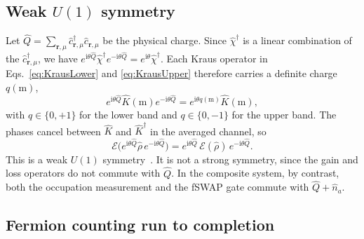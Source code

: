 \documentclass[aps,prb,10pt,twocolumn,superscriptaddress,longbibliography,floatfix]{revtex4-2}
\newcommand{\ii}{\mathrm{i}}
\newcommand{\mc}[1]{\mathcal{#1}}
\newcommand{\bfr}{\boldsymbol r}
\begin{document}
\subsection{Weak \texorpdfstring{$U(1)$}{U(1)} symmetry}

Let $\hat Q=\sum_{\bfr,\mu}\hat c^\dagger_{\bfr,\mu}\hat c_{\bfr,\mu}$ be the physical charge. Since $\hat\chi^\dagger$ is a linear combination of the $\hat c^\dagger_{\bfr,\mu}$, we have $e^{\ii\theta\hat Q}\hat\chi^\dagger e^{-\ii\theta\hat Q}=e^{\ii\theta}\hat\chi^\dagger$. Each Kraus operator in Eqs.~\eqref{eq:KrausLower} and \eqref{eq:KrausUpper} therefore carries a definite charge $q(\mathrm{m})$,
\begin{equation}
    e^{\ii\theta\hat Q}\hat K(\mathrm{m})e^{-\ii\theta\hat Q}=e^{\ii\theta q(\mathrm{m})}\hat K(\mathrm{m}),
    \label{eq:KrausCharge}
\end{equation}
with $q\in\{0,+1\}$ for the lower band and $q\in\{0,-1\}$ for the upper band. The phases cancel between $\hat K$ and $\hat K^\dagger$ in the averaged channel, so
\begin{equation}
    \mc E\big(e^{\ii\theta\hat Q}\hat\rho\,e^{-\ii\theta\hat Q}\big)=e^{\ii\theta\hat Q}\,\mc E(\hat\rho)\,e^{-\ii\theta\hat Q}.
    \label{eq:WeakU1}
\end{equation}
This is a weak $U(1)$ symmetry~\cite{BucaProsen2012,AlbertJiang2014}. It is not a strong symmetry, since the gain and loss operators do not commute with $\hat Q$. In the composite system, by contrast, both the occupation measurement and the fSWAP gate commute with $\hat Q+\hat n_a$.

\subsection{Fermion counting run to completion}
\end{document}
